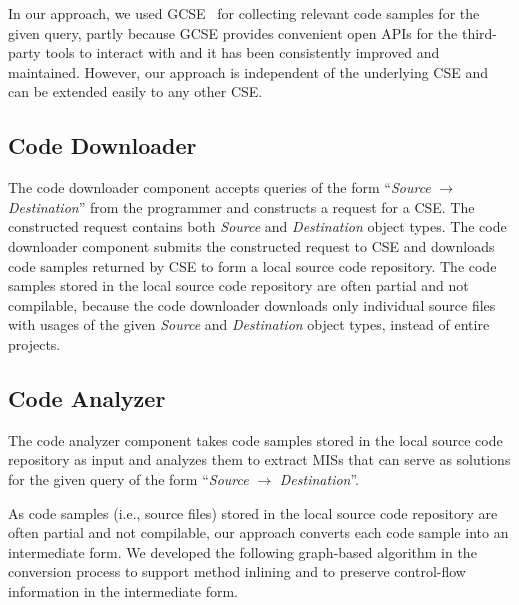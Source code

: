 \documentclass{fp035-thummalapenta}
\begin{document}
In our approach, we used GCSE~\cite{GCSE} for collecting relevant code samples for the
given query, partly because GCSE provides convenient open APIs for the
third-party tools to interact with and it has been consistently
improved and maintained. However, our approach is independent of the
underlying CSE and can be extended easily to any other CSE.

\subsection{Code Downloader}

The code downloader component accepts queries of the form
``\emph{Source} $\rightarrow$ \emph{Destination}'' from the
programmer and constructs a request for a CSE. The constructed
request contains both \emph{Source} and \emph{Destination} object
types. The code downloader component submits the constructed request
to CSE and downloads code samples returned by CSE to form a local
source code repository. The code samples stored in the local source
code repository are often partial and not compilable, because the
code downloader downloads only individual source files with usages
of the given \emph{Source} and \emph{Destination} object types,
instead of entire projects.
\subsection{Code Analyzer}
The code analyzer component takes code samples stored in the local
source code repository as input and analyzes them to extract MISs
that can serve as solutions for the given query of the form
``\emph{Source} $\rightarrow$ \emph{Destination}''.

As code samples (i.e., source files) stored in the local source code
repository are often partial and not compilable, our approach converts
each code sample into an intermediate form. We developed the
following graph-based algorithm in the conversion process to support
method inlining and to preserve control-flow information in the
intermediate form.
\end{document}
